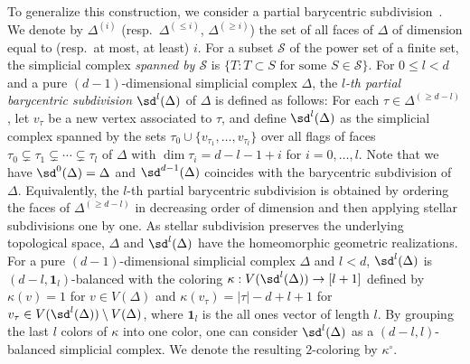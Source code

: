 To generalize this construction, we consider a partial barycentric subdivision~\cite{AW}.
We denote by $\Delta^{(i)}$ (resp.~$\Delta^{(\leq i)}$, $\Delta^{(\geq i)}$) the set of all faces of $\Delta$ of dimension equal to (resp.~at most, at least) $i$.
For a subset $\mathcal{S}$ of the power set of a finite set, the simplicial complex \emph{spanned by $\mathcal{S}$} is $\{T:T\subset S \text{ for some } S \in \mathcal{S}\}$.
For $0 \leq l < d$ and a pure $(d-1)$-dimensional simplicial complex $\Delta$, the \emph{$l$-th partial barycentric subdivision} $\sd^l(\Delta)$ of $\Delta$ is defined as follows: For each $\tau \in \Delta^{(\geq d-l)}$, let $v_{\tau}$ be a new vertex associated to $\tau$, and define $\sd^l(\Delta)$ as the simplicial complex spanned by the sets $\tau_0 \cup \{v_{\tau_1}, \ldots, v_{\tau_l}\}$ over all flags of faces $\tau_0 \subsetneq \tau_1 \subsetneq \cdots \subsetneq \tau_l$ of $\Delta$ with $\dim \tau_i=d-l-1+i$ for $i=0,\ldots,l$.
Note that we have $\sd^0(\Delta)=\Delta$ and $\sd^{d-1}(\Delta)$ coincides with the barycentric subdivision of $\Delta$. 
Equivalently, the $l$-th partial barycentric subdivision is obtained by ordering the faces of $\Delta^{(\geq d-l)}$ in decreasing order of dimension and then applying stellar subdivisions one by one.
As stellar subdivision preserves the underlying topological space, $\Delta$ and $\sd^l(\Delta)$ have the homeomorphic geometric realizations.
For a pure $(d-1)$-dimensional simplicial complex $\Delta$ and $l<d$, $\sd^l(\Delta)$ is $(d-l,\bm{1}_l)$-balanced with the coloring $\kappa:V(\sd^l(\Delta)) \rightarrow [l+1]$ defined by $\kappa(v)=1$ for $v \in V(\Delta)$ and $\kappa(v_\tau)=|\tau|-d+l+1$ for $v_\tau \in V(\sd^l(\Delta)) \setminus V(\Delta)$, where $\bm{1}_{l}$ is the all ones vector of length $l$.
By grouping the last $l$ colors of $\kappa$ into one color, one can consider $\sd^l(\Delta)$ as a $(d-l,l)$-balanced simplicial complex. We denote the resulting $2$-coloring by $\kappa^\circ$.

